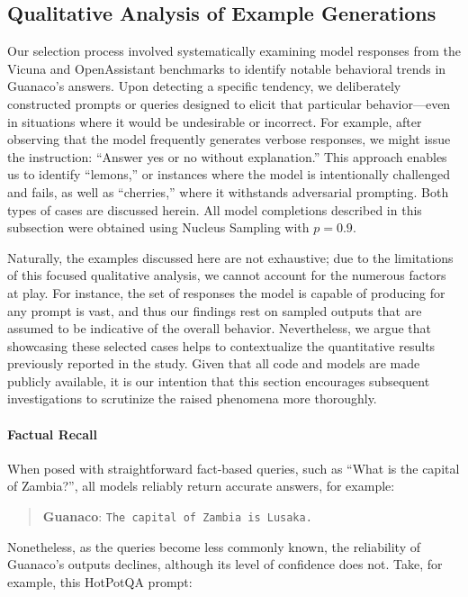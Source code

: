 \subsection{Qualitative Analysis of Example Generations}
\label{ssec:examples}

Our selection process involved systematically examining model responses from the Vicuna and OpenAssistant benchmarks to identify notable behavioral trends in {Guanaco}'s answers. Upon detecting a specific tendency, we deliberately constructed prompts or queries designed to elicit that particular behavior—even in situations where it would be undesirable or incorrect. For example, after observing that the model frequently generates verbose responses, we might issue the instruction: ``Answer yes or no without explanation.'' This approach enables us to identify ``lemons,'' or instances where the model is intentionally challenged and fails, as well as ``cherries,'' where it withstands adversarial prompting. Both types of cases are discussed herein. All model completions described in this subsection were obtained using Nucleus Sampling \cite{holtzmancurious} with $p=0.9$.

Naturally, the examples discussed here are not exhaustive; due to the limitations of this focused qualitative analysis, we cannot account for the numerous factors at play. For instance, the set of responses the model is capable of producing for any prompt is vast, and thus our findings rest on sampled outputs that are assumed to be indicative of the overall behavior. Nevertheless, we argue that showcasing these selected cases helps to contextualize the quantitative results previously reported in the study. Given that all code and models are made publicly available, it is our intention that this section encourages subsequent investigations to scrutinize the raised phenomena more thoroughly.

\paragraph{Factual Recall} When posed with straightforward fact-based queries, such as ``What is the capital of Zambia?'', all models reliably return accurate answers, for example:

\begin{quote} 
    \textbf{Guanaco}:
    \texttt{The capital of Zambia is Lusaka.}
\end{quote}

Nonetheless, as the queries become less commonly known, the reliability of {Guanaco}'s outputs declines, although its level of confidence does not. Take, for example, this HotPotQA \citep{yang2018hotpotqa} prompt:

